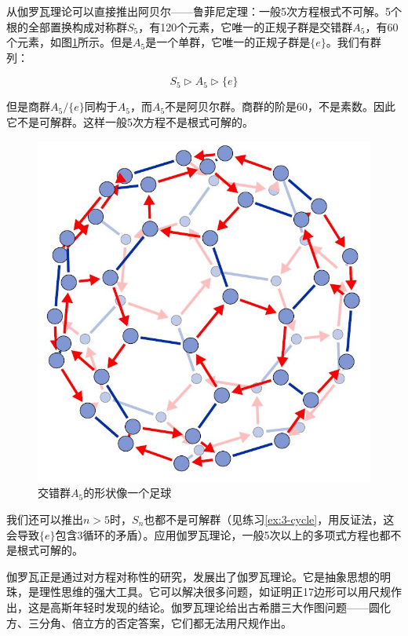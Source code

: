 \documentclass[b5paper]{ctexart}
\begin{document}
从伽罗瓦理论可以直接推出阿贝尔——鲁菲尼定理：一般5次方程根式不可解。5个根的全部置换构成对称群$S_5$，有120个元素，它唯一的正规子群是交错群$A_5$，有60个元素，如图\ref{fig:A5-Cayley}所示。但是$A_5$是一个单群，它唯一的正规子群是$\{e\}$。我们有群列：

\[
S_5 \rhd A_5 \rhd \{e\}
\]

但是商群$A_5/\{e\}$同构于$A_5$，而$A_5$不是阿贝尔群。商群的阶是60，不是素数。因此它不是可解群。这样一般5次方程不是根式可解的。

\begin{figure}[htbp]
 \centering
 \includegraphics[scale=0.25]{img/A5-Cayley}
 \captionsetup{labelformat=empty}
 \caption{交错群$A_5$的形状像一个足球}
 \label{fig:A5-Cayley}
\end{figure}

我们还可以推出$n > 5$时，$S_n$也都不是可解群（见练习\ref{ex:3-cycle}，用反证法，这会导致$\{e\}$包含3循环的矛盾）。应用伽罗瓦理论，一般5次以上的多项式方程也都不是根式可解的。

伽罗瓦正是通过对方程对称性的研究，发展出了伽罗瓦理论。它是抽象思想的明珠，是理性思维的强大工具。它可以解决很多问题，如证明正17边形可以用尺规作出，这是高斯年轻时发现的结论。伽罗瓦理论给出古希腊三大作图问题——圆化方、三分角、倍立方的否定答案，它们都无法用尺规作出。

\begin{Exercise}
\label{ex:3-cycle}
\end{Exercise}
\end{document}
